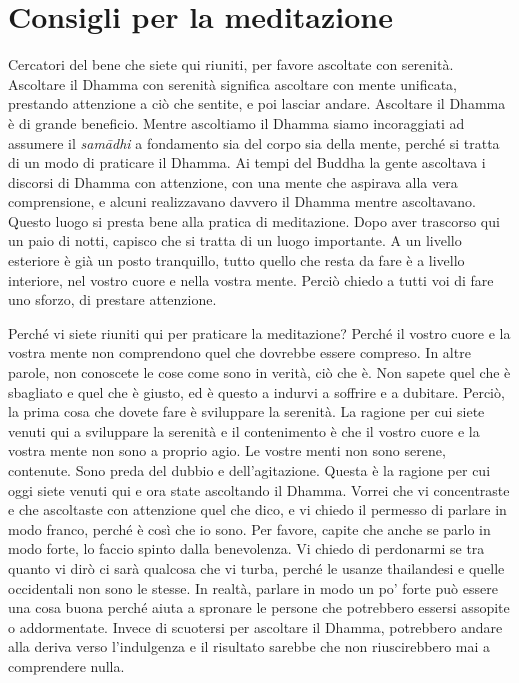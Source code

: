 \chapter{Consigli per la meditazione}

Cercatori del bene che siete qui riuniti, per favore ascoltate con
serenità. Ascoltare il Dhamma con serenità significa ascoltare con mente
unificata, prestando attenzione a ciò che sentite, e poi lasciar andare.
Ascoltare il Dhamma è di grande beneficio. Mentre ascoltiamo il Dhamma
siamo incoraggiati ad assumere il \emph{samādhi} a fondamento sia del
corpo sia della mente, perché si tratta di un modo di praticare il
Dhamma. Ai tempi del Buddha la gente ascoltava i discorsi di Dhamma con
attenzione, con una mente che aspirava alla vera comprensione, e alcuni
realizzavano davvero il Dhamma mentre ascoltavano. Questo luogo si
presta bene alla pratica di meditazione. Dopo aver trascorso qui un paio
di notti, capisco che si tratta di un luogo importante. A un livello
esteriore è già un posto tranquillo, tutto quello che resta da fare è a
livello interiore, nel vostro cuore e nella vostra mente. Perciò chiedo
a tutti voi di fare uno sforzo, di prestare attenzione.

Perché vi siete riuniti qui per praticare la meditazione? Perché il
vostro cuore e la vostra mente non comprendono quel che dovrebbe essere
compreso. In altre parole, non conoscete le cose come sono in verità,
ciò che è. Non sapete quel che è sbagliato e quel che è giusto, ed è
questo a indurvi a soffrire e a dubitare. Perciò, la prima cosa che
dovete fare è sviluppare la serenità. La ragione per cui siete venuti
qui a sviluppare la serenità e il contenimento è che il vostro cuore e
la vostra mente non sono a proprio agio. Le vostre menti non sono
serene, contenute. Sono preda del dubbio e dell'agitazione. Questa è la
ragione per cui oggi siete venuti qui e ora state ascoltando il Dhamma.
Vorrei che vi concentraste e che ascoltaste con attenzione quel che
dico, e vi chiedo il permesso di parlare in modo franco, perché è così
che io sono. Per favore, capite che anche se parlo in modo forte, lo
faccio spinto dalla benevolenza. Vi chiedo di perdonarmi se tra quanto
vi dirò ci sarà qualcosa che vi turba, perché le usanze thailandesi e
quelle occidentali non sono le stesse. In realtà, parlare in modo un po'
forte può essere una cosa buona perché aiuta a spronare le persone che
potrebbero essersi assopite o addormentate. Invece di scuotersi per
ascoltare il Dhamma, potrebbero andare alla deriva verso l'indulgenza e
il risultato sarebbe che non riuscirebbero mai a comprendere nulla.

